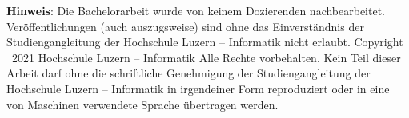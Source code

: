 	

	\noindent
	{\textbf{Hinweis}}: Die Bachelorarbeit wurde von keinem Dozierenden nachbearbeitet. Ver\"offentlichungen (auch auszugsweise) sind ohne das Einverst\"andnis der Studiengangleitung der Hochschule Luzern -- Informatik nicht erlaubt. \newline \newline
	Copyright \textcopyright\ {2021} Hochschule Luzern -- Informatik \newline \newline
	Alle Rechte vorbehalten. Kein Teil dieser Arbeit darf ohne die schriftliche Genehmigung der Studiengangleitung der Hochschule Luzern -- Informatik in irgendeiner Form reproduziert oder in eine von Maschinen verwendete Sprache übertragen werden.
	
	\newpage
	

